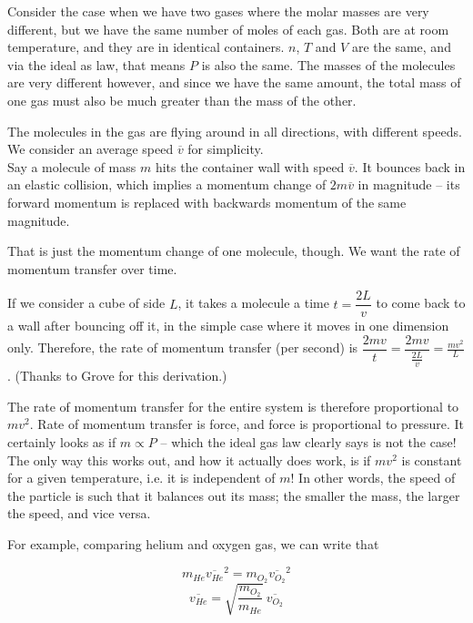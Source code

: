 \documentclass[8.01x]{subfiles}
\begin{document}
Consider the case when we have two gases where the molar masses are very different, but we have the same number of moles of each gas. Both are at room temperature, and they are in identical containers. $n$, $T$ and $V$ are the same, and via the ideal as law, that means $P$ is also the same. The masses of the molecules are very different however, and since we have the same amount, the total mass of one gas must also be much greater than the mass of the other.

The molecules in the gas are flying around in all directions, with different speeds. We consider an average speed $\overbar{v}$ for simplicity.\\
Say a molecule of mass $m$ hits the container wall with speed $\overbar{v}$. It bounces back in an elastic collision, which implies a momentum change of $2 m \overbar{v}$ in magnitude -- its forward momentum is replaced with backwards momentum of the same magnitude.

That is just the momentum change of one molecule, though. We want the rate of momentum transfer over time.

If we consider a cube of side $L$, it takes a molecule a time $t = \dfrac{2 L}{v}$ to come back to a wall after bouncing off it, in the simple case where it moves in one dimension only. Therefore, the rate of momentum transfer (per second) is $\dfrac{2 m v}{t} = \dfrac{2 m v}{\frac{2 L}{v}} = \frac{m v^2}{L}$. (Thanks to Grove for this derivation.)

The rate of momentum transfer for the entire system is therefore proportional to $m v^2$. Rate of momentum transfer is force, and force is proportional to pressure. It certainly looks as if $m \propto P$ -- which the ideal gas law clearly says is not the case!\\
The only way this works out, and how it actually does work, is if $m v^2$ is constant for a given temperature, i.e. it is independent of $m$! In other words, the speed of the particle is such that it balances out its mass; the smaller the mass, the larger the speed, and vice versa.

For example, comparing helium and oxygen gas, we can write that

\begin{equation}
m_{He} \overbar{v_{He}}^2 = m_{O_2} \overbar{v_{O_2}}^2
\end{equation}
\begin{equation}
\overbar{v_{He}} = \sqrt{\frac{m_{O_2}}{m_{He}}}\ \overbar{v_{O_2}}
\end{equation}
\end{document}
